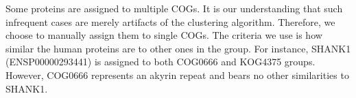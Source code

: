 \begin{Shaded}
\end{Shaded}

Some proteins are assigned to multiple COGs. It is our understanding
that such infrequent cases are merely artifacts of the clustering
algorithm. Therefore, we choose to manually assign them to single COGs.
The criteria we use is how similar the human proteins are to other ones
in the group. For instance, SHANK1 (ENSP00000293441) is assigned to both
COG0666 and KOG4375 groups. However, COG0666 represents an akyrin repeat
and bears no other similarities to SHANK1.

\begin{Shaded}
\end{Shaded}

